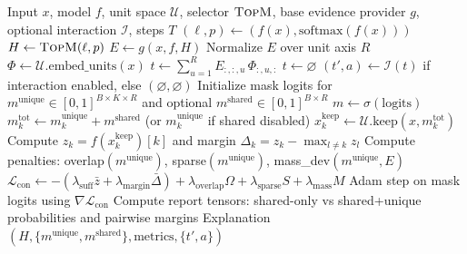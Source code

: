 
\begin{algorithm}[t]
\caption{CDEA Instantiation I: Contrastive Shared-Unique Allocation}
\label{alg:cdea-contrastive}
\begin{algorithmic}[1]
\Require Input $x$, model $f$, unit space $\mathcal{U}$, selector $\textsc{TopM}$, base evidence provider $g$, optional interaction $\mathcal{I}$, steps $T$
\State $(\ell, p) \gets (f(x), \mathrm{softmax}(f(x)))$
\State $H \gets \textsc{TopM}(\ell, p)$ 
\State $E \gets g(x, f, H)$ 
\State Normalize $E$ over unit axis $R$
    \State $\Phi \gets \mathcal{U}.\mathrm{embed\_units}(x)$ 
    \State $t \gets \sum_{u=1}^{R} E_{:,:,u}\,\Phi_{:,u,:}$ 
\Else
    \State $t \gets \varnothing$
\EndIf
\State $(t', a) \gets \mathcal{I}(t)$ if interaction enabled, else $(\varnothing,\varnothing)$
\State Initialize mask logits for $m^{\text{unique}} \in [0,1]^{B \times K \times R}$ and optional $m^{\text{shared}} \in [0,1]^{B \times R}$
    \State $m \gets \sigma(\text{logits})$
        \State $m_k^{\text{tot}} \gets m_k^{\text{unique}} + m^{\text{shared}}$ (or $m_k^{\text{unique}}$ if shared disabled)
        \State $x_k^{\text{keep}} \gets \mathcal{U}.\mathrm{keep}(x, m_k^{\text{tot}})$
        \State Compute $z_k = f(x_k^{\text{keep}})[k]$ and margin $\Delta_k = z_k - \max_{l\neq k} z_l$
    \EndFor
    \State Compute penalties: overlap$(m^{\text{unique}})$, sparse$(m^{\text{unique}})$, mass\_dev$(m^{\text{unique}},E)$
    \State $\mathcal{L}_{\text{con}} \gets -(\lambda_{\text{suff}}\bar{z} + \lambda_{\text{margin}}\bar{\Delta}) + \lambda_{\text{overlap}}\Omega + \lambda_{\text{sparse}}S + \lambda_{\text{mass}}M$
    \State Adam step on mask logits using $\nabla \mathcal{L}_{\text{con}}$
\EndFor
\State Compute report tensors: shared-only vs shared+unique probabilities and pairwise margins
\State \Return Explanation$(H,\{m^{\text{unique}},m^{\text{shared}}\},\text{metrics},\{t',a\})$
\end{algorithmic}
\end{algorithm}

